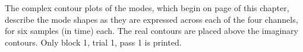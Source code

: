 \documentclass[a4paper,10pt]{report}
\numberwithin{equation}{section}
\begin{document}
The complex contour plots of the modes, which begin on page \pageref{fig:mode_contours} of this chapter, describe the mode shapes as they are expressed across each of the four channels, for six samples (in time) each. The real contours are placed above the imaginary contours. Only block 1, trial 1, pass 1 is printed.

\begin{singlespace}


\end{singlespace}
\end{document}
